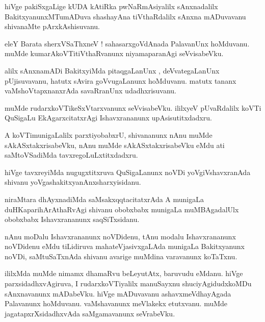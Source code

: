 \documentclass{article}
\begin{document}
\begin{mn}
hiVge pakiSxgaLige kUDA kAtiRka pwNaRmAsiyalilx sAnxnadalilx BakitxyanunxMTumADuva shashayAna
tiVthaRdalilx sAnxna mADuvavanu shivanaMte pArxkAshisuvanu.
\end{mn}

\begin{mn}
eleY Barata sherxVSaThxneV ! sahasarxgoVdAnada PalavanUnx hoMduvanu. muMde kumarAkoVTitiVthaRvanunx 
niyamaparanAgi  seVvisabeVku.
\end{mn}

\begin{mn}
alilx sAnxnamADi BakitxyiMda pitaqgaLanUnx , deVvategaLanUnx pUjisuvavanu, hatutx sAvira 
goVvugaLanunx  hoMduvanu. matutx tananx vaMshoVtapxnanxrAda savaRranUnx udadhxrisuvanu.
\end{mn}

\begin{mn}
muMde rudarxkoVTikeSxVtarxvanunx seVvisabeVku. ililxyeV pUvaRdalilx koVTi QuSigaLu 
EkAgarxcitatxrAgi Ishavxrananunx upAsisutitxdadxru.
\end{mn}

\begin{mn}
A koVTimunigaLalilx parxtiyobabxrU, shivananunx nAnu muMde sAkASxtakxrisabeVku, nAnu muMde 
sAkASxtakxrisabeVku eMdu ati saMtoVSadiMda tavxregoLuLxtitxdadxru.
\end{mn}

\begin{mn}
hiVge tavxreyiMda nugugxtitxruva QuSigaLanunx noVDi yoVgiVshavxranAda shivanu 
yoVgashakitxyanAnxsharxyisidanu.
\end{mn}

\begin{mn}
niraMtara dhAyxnadiMda saMsakxqqtacitatxrAda A munigaLa duHKaparihArAthaRvAgi shivanu obobxbabx 
munigaLa muMBAgadalUlx obobxbabx Ishavxrananunx saqSiTxsidanu.
\end{mn}

\begin{mn}
nAnu moDalu Ishavxrananunx noVDidenu, tAnu modalu Ishavxrananunx noVDidenu eMdu 
tiLidiruva mahateVjasivxgaLAda munigaLa Bakitxyanunx noVDi, saMtuSaTxnAda shivanu avarige muMdina 
varavanunx koTaTxnu.
\end{mn}

\begin{mn}
ililxMda muMde  nimamx dhamaRvu beLeyutAtx, baruvudu eMdanu. hiVge parxsidadhxvAgiruva, I 
rudarxkoVTiyalilx  manuSayxnu shuciyAgidudxkoMDu sAnxnavanunx mADabeVku. hiVge mADuvavanu 
ashavxmeVdhayAgada Palavanunx hoMduvanu. vaMshavanunx meVlakekx etutxvanu. muMde 
jagatapxrXsidadhxvAda saMgamavanunx seVrabeVku.
\end{mn}
\end{document}
